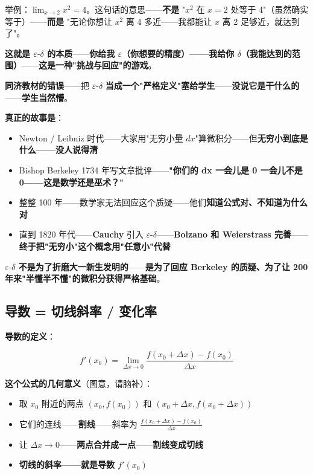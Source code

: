 举例：$\lim_{x \to 2} x^2 = 4$。这句话的意思——\textbf{不是} "$x^2$ 在 $x=2$ 处等于 4"（虽然确实等于）——\textbf{而是} "无论你想让 $x^2$ 离 4 多近——我都能让 $x$ 离 2 足够近，就达到了"。

\textbf{这就是 $\varepsilon\text{-}\delta$ 的本质}——\textbf{你给我 $\varepsilon$（你想要的精度）——我给你 $\delta$（我能达到的范围）}——\textbf{这是一种"挑战与回应"的游戏}。

\textbf{同济教材的错误}——把 $\varepsilon\text{-}\delta$ \textbf{当成一个"严格定义"塞给学生}——\textbf{没说它是干什么的}——\textbf{学生当然懵}。

\textbf{真正的故事是}：

\begin{itemize}
\item Newton / Leibniz 时代——大家用"无穷小量 $dx$"算微积分——但\textbf{无穷小到底是什么——没人说得清}
\item Bishop Berkeley 1734 年写文章批评——\textbf{"你们的 dx 一会儿是 0 一会儿不是 0——这是数学还是巫术？"}
\item 整整 100 年——数学家无法回应这个质疑——他们\textbf{知道公式对、不知道为什么对}
\item 直到 1820 年代——\textbf{Cauchy} 引入 $\varepsilon\text{-}\delta$——\textbf{Bolzano 和 Weierstrass 完善}——\textbf{终于把"无穷小"这个概念用"任意小"代替}
\end{itemize}

\textbf{$\varepsilon\text{-}\delta$ 不是为了折磨大一新生发明的}——\textbf{是为了回应 Berkeley 的质疑、为了让 200 年来"半懂半不懂"的微积分获得严格基础}。

\subsection{导数 = 切线斜率 / 变化率}

\textbf{导数的定义}：

\begin{equation}
f'(x_0) = \lim_{\Delta x \to 0} \frac{f(x_0 + \Delta x) - f(x_0)}{\Delta x}
\end{equation}

\textbf{这个公式的几何意义}（图意，请脑补）：

\begin{itemize}
\item 取 $x_0$ 附近的两点 $(x_0, f(x_0))$ 和 $(x_0 + \Delta x, f(x_0 + \Delta x))$
\item 它们的连线——\textbf{割线}——斜率为 $\frac{f(x_0+\Delta x) - f(x_0)}{\Delta x}$
\item 让 $\Delta x \to 0$——\textbf{两点合并成一点}——\textbf{割线变成切线}
\item \textbf{切线的斜率——就是导数 $f'(x_0)$}
\end{itemize}

